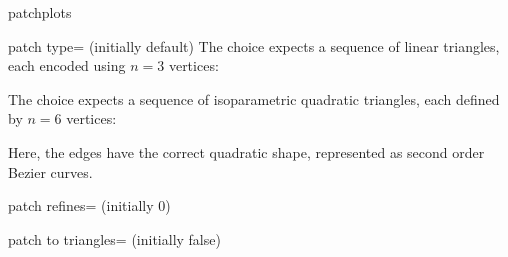 \begin{pgfplotslibrary}{patchplots}
\begin{pgfplotskey}{patch type= (initially default)}
	The choice  expects a sequence of linear triangles, each encoded using $n=3$ vertices:
\begin{codeexample}[]
\end{codeexample}

	The choice  expects a sequence of isoparametric quadratic triangles, each defined by $n=6$ vertices:
\begin{codeexample}[]
\end{codeexample}
	\noindent Here, the edges have the correct quadratic shape, represented as second order Bezier curves.
\end{pgfplotskey}

\begin{pgfplotskey}{patch refines= (initially 0)}
	
\end{pgfplotskey}

\begin{pgfplotskey}{patch to triangles= (initially false)}
	
\end{pgfplotskey}

\end{pgfplotslibrary}

